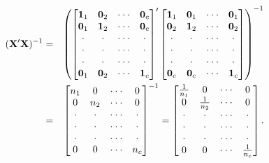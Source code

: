 \begin{center}
\begin{eqnarray}\label{E4:OneFactorXPrimeX}
(\mathbf{X^{\prime }X})^{-1} &=&\left(
\begin{bmatrix}
\mathbf{1}_1 & \mathbf{0}_2 & \cdot \cdot \cdot  & \mathbf{0}_c \\
\mathbf{0}_1 & \mathbf{1}_2 & \cdot \cdot \cdot  & \mathbf{0}_c \\
\cdot  & \cdot  & \cdot \cdot \cdot  & \cdot  \\
\cdot  & \cdot  & \cdot \cdot \cdot  & \cdot  \\
\cdot  & \cdot  & \cdot \cdot \cdot  & \cdot  \\
\mathbf{0}_1 & \mathbf{0}_2 & \cdot \cdot \cdot  & \mathbf{1}_c%
\end{bmatrix}^{\prime }%
\begin{bmatrix}
\mathbf{1}_1 & \mathbf{0}_1 & \cdot \cdot \cdot  & \mathbf{0}%
_1 \\
\mathbf{0}_2 & \mathbf{1}_2 & \cdot \cdot \cdot  & \mathbf{0}%
_2 \\
\cdot  & \cdot  & \cdot \cdot \cdot  & \cdot  \\
\cdot  & \cdot  & \cdot \cdot \cdot  & \cdot  \\
\cdot  & \cdot  & \cdot \cdot \cdot  & \cdot  \\
\mathbf{0}_{c} & \mathbf{0}_{c} & \cdot \cdot \cdot  & \mathbf{1}_c
\end{bmatrix} \notag
\right) ^{-1} \\
&=&%
\begin{bmatrix}
n_1 & 0 & \cdot \cdot \cdot  & 0 \\
0 & n_2 & \cdot \cdot \cdot  & 0 \\
\cdot  & \cdot  & \cdot \cdot \cdot  & \cdot  \\
\cdot  & \cdot  & \cdot \cdot \cdot  & \cdot  \\
\cdot  & \cdot  & \cdot \cdot \cdot  & \cdot  \\
0 & 0 & \cdot \cdot \cdot  & n_c%
\end{bmatrix}%
^{-1}=%
\begin{bmatrix}
\frac{1}{n_1} & 0 & \cdot \cdot \cdot  & 0 \\
0 & \frac{1}{n_2} & \cdot \cdot \cdot  & 0 \\
\cdot  & \cdot  & \cdot \cdot \cdot  & \cdot  \\
\cdot  & \cdot  & \cdot \cdot \cdot  & \cdot  \\
\cdot  & \cdot  & \cdot \cdot \cdot  & \cdot  \\
0 & 0 & \cdot \cdot \cdot  & \frac{1}{n_c}
\end{bmatrix}%
.
\end{eqnarray}
\end{center}

